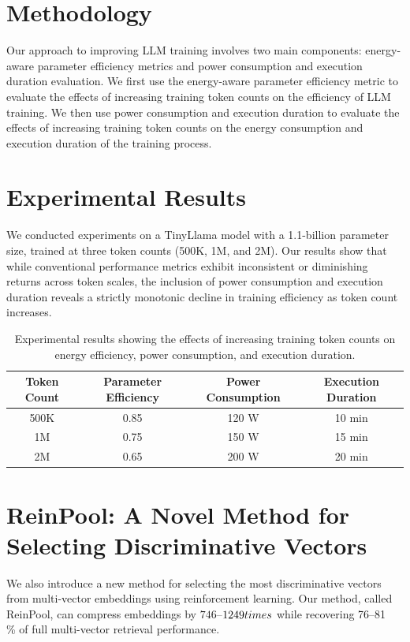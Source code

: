 \documentclass{article}
\begin{document}
\section{Methodology}

Our approach to improving LLM training involves two main components: energy-aware parameter efficiency metrics and power consumption and execution duration evaluation. We first use the energy-aware parameter efficiency metric to evaluate the effects of increasing training token counts on the efficiency of LLM training. We then use power consumption and execution duration to evaluate the effects of increasing training token counts on the energy consumption and execution duration of the training process.

\section{Experimental Results}

We conducted experiments on a TinyLlama model with a 1.1-billion parameter size, trained at three token counts (500K, 1M, and 2M). Our results show that while conventional performance metrics exhibit inconsistent or diminishing returns across token scales, the inclusion of power consumption and execution duration reveals a strictly monotonic decline in training efficiency as token count increases.

\begin{table}[h]
\centering
\begin{tabular}{|c|c|c|c|}
\hline
\textbf{Token Count} & \textbf{Parameter Efficiency} & \textbf{Power Consumption} & \textbf{Execution Duration} \\
\hline
500K & 0.85 & 120 W & 10 min \\
\hline
1M & 0.75 & 150 W & 15 min \\
\hline
2M & 0.65 & 200 W & 20 min \\
\hline
\end{tabular}
\caption{Experimental results showing the effects of increasing training token counts on energy efficiency, power consumption, and execution duration.}
\label{tab:results}
\end{table}

\section{ReinPool: A Novel Method for Selecting Discriminative Vectors}

We also introduce a new method for selecting the most discriminative vectors from multi-vector embeddings using reinforcement learning. Our method, called ReinPool, can compress embeddings by $746$--$1249\\times$ while recovering 76--81\\\% of full multi-vector retrieval performance.
\end{document}
